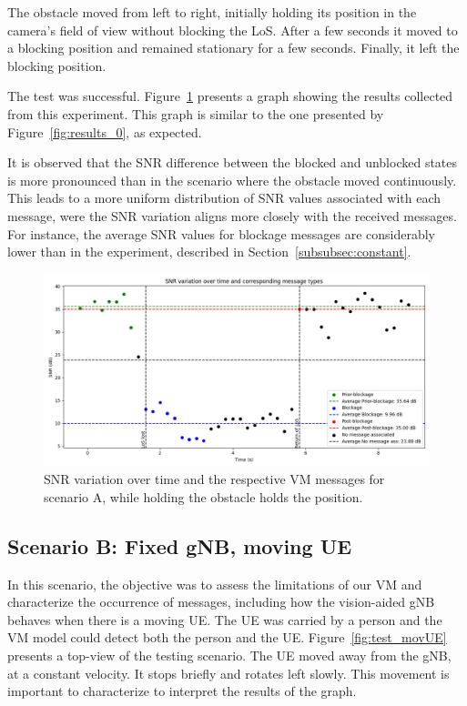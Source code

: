 The obstacle moved from left to right, initially holding its position in the camera's field of view without blocking the LoS\@.
After a few seconds it moved to a blocking position and remained stationary for a few seconds.
Finally, it left the blocking position.

The test was successful.
Figure~\ref{fig:results_01} presents a graph showing the results collected from this experiment.
This graph is similar to the one presented by Figure~\ref{fig:results_0}, as expected.

It is observed that the SNR difference between the blocked and unblocked states is more pronounced than in the scenario where the obstacle moved continuously.
This leads to a more uniform distribution of SNR values associated with each message, were the SNR variation aligns more closely with the received messages.
For instance, the average SNR values for blockage messages are considerably lower than in the experiment, described in Section~\ref{subsubsec:constant}.

\begin{figure}[H]
    \centering
    \includegraphics[width=\linewidth]{figures/results_01}
    \caption{SNR variation over time and the respective VM messages for scenario A, while holding the obstacle holds the position.}
    \label{fig:results_01}
\end{figure}


\subsection{Scenario B: Fixed gNB, moving UE}\label{subsec:scenario-0.1:-fixed-gnb-moving-ue}

In this scenario, the objective was to assess the limitations of our VM and characterize the occurrence of messages, including how the vision-aided gNB behaves when there is a moving UE\@.
The UE was carried by a person and the VM model could detect both the person and the UE\@.
Figure~\ref{fig:test_movUE} presents a top-view of the testing scenario.
The UE moved away from the gNB, at a constant velocity.
It stops briefly and rotates left slowly.
This movement is important to characterize to interpret the results of the graph.

